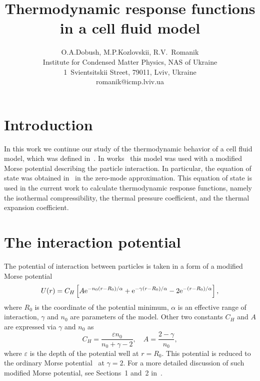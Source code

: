 \documentclass[12pt]{article}
\title{Thermodynamic response functions in a cell fluid model}
\author{O.A.Dobush, M.P.Kozlovskii, R.V.~Romanik
	\\ \small Institute for Condensed Matter Physics, NAS of Ukraine 
	\\ \small 1~Svientsitskii Street, 79011, Lviv, Ukraine 
	\\ \small romanik@icmp.lviv.ua}
\begin{document}
	
	\maketitle
	
	
	\section{Introduction}
	
	In this work we continue our study of the thermodynamic behavior of a cell fluid model, which was defined in~\cite{KozitskyKozlovskiiDobush2018book,KozitskyKozlovskiiDobush2020}. In works~\cite{KozlovskiiDobush2020,PylyukDobush2020,PylyukEtAlJML2023,PylyukKozlovskiiDobushUJP2023b} this model was used with a modified Morse potential describing the particle interaction. In particular, the equation of state was obtained in~\cite{KozlovskiiDobush2020} in the zero-mode approximation. This equation of state is used in the current work to calculate thermodynamic response functions, namely the isothermal compressibility, the thermal pressure coefficient, and the thermal expansion coefficient.
	
	\section{The interaction potential}
	The potential of interaction between particles is taken in a form of a modified Morse potential
	\begin{equation}
		U(r) = C_{H} \left[A {\rm e}^{-n_0(r-R_0)/\alpha} + {\rm e}^{-\gamma(r - R_0)/\alpha} -2{\rm e}^{-(r-R_0)/\alpha}\right],
	\end{equation}
	where $R_0$ is the coordinate of the potential minimum, $\alpha$ is an effective range of interaction, $\gamma$ and $n_0$ are parameters of the model. Other two constants $C_{H}$ and $A$ are expressed via $\gamma$ and $n_0$ as
	\begin{equation}
		C_{H} = \frac{\varepsilon n_0}{n_0 + \gamma - 2}, \quad A = \frac{2 - \gamma}{n_0},
	\end{equation}
	where $\varepsilon$ is the depth of the potential well at $r=R_0$. This potential is reduced to the ordinary Morse potential~\cite{Morse1929} at $\gamma=2$. For a more detailed discussion of such modified Morse potential, see Sections~1 and~2 in~\cite{KozlovskiiDobush2020}.
	
\end{document}

